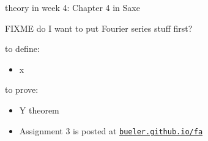 \documentclass[10pt,
               svgnames,
               hyperref={colorlinks,
                         citecolor=DeepPink4,
                         linkcolor=FireBrick,
                         urlcolor=Maroon},
               usepdftitle=false]{beamer}
\begin{document}
\begin{frame}{theory in week 4: Chapter 4 in Saxe}

FIXME do I want to put Fourier series stuff first?

\begin{block}{to define:}
\begin{itemize}
\item x
\end{itemize}
\end{block}

\begin{block}{to prove:}
\begin{itemize}
\item Y theorem
\end{itemize}
\end{block}

\begin{itemize}
\item Assignment 3 is posted at \quad  \href{https://bueler.github.io/fa/index.html}{\texttt{bueler.github.io/fa}}
\end{itemize}
\end{frame}
\end{document}
